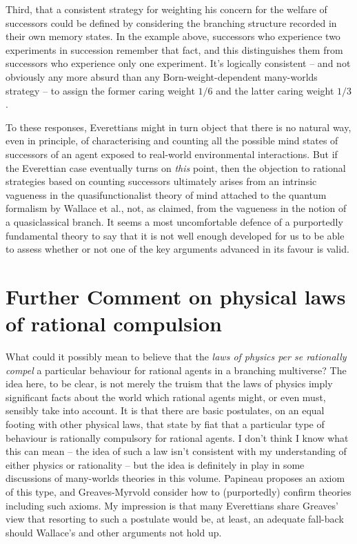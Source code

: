 \documentclass[aps,
pra,epsfig]{revtex4}
\begin{document}
Third, that a consistent strategy for weighting his concern for the 
welfare of successors could be defined by considering the branching 
structure recorded in their own memory states.   In the example
above, successors who
experience two experiments in succession remember that fact, and 
this distinguishes them from successors who experience only one
experiment.  It's logically consistent -- and not obviously any
more absurd than any Born-weight-dependent many-worlds strategy -- to assign
the former caring weight $1/6$ and the latter caring weight $1/3$. 

To these responses, Everettians might in turn object
that there is no natural way,
even in principle, of characterising and counting all the possible
mind states of successors of an agent exposed to real-world
environmental interactions.  But if the Everettian case eventually
turns on {\it this} point, then 
the objection to rational strategies based on counting successors
ultimately arises from an intrinsic vagueness in the quasifunctionalist 
theory of mind attached to the quantum formalism by Wallace et al.,
not, as claimed, from the vagueness in the notion of a quasiclassical
branch.  It seems a most uncomfortable defence of a
purportedly fundamental theory to say that it is not well enough developed
for us to be able to assess whether or not one of the key arguments
advanced in its favour is valid.  

\section{Further Comment on physical laws of rational 
compulsion}\label{rationalconstraint}

What could it possibly mean to 
believe that the {\it laws of physics per se rationally compel} 
a particular behaviour for rational agents in a branching multiverse?   
The idea here, to be clear, is not merely the truism that the laws of physics 
imply significant facts about the world
which rational agents might, or even must, sensibly take into account. 
It is that there are basic postulates, on an equal footing
with other physical laws, that state by fiat that a particular type of
behaviour is rationally compulsory for rational agents.   
I don't think I know what this can mean -- 
the idea of such a law isn't consistent with my understanding of 
either physics or rationality -- but the 
idea is definitely in play in 
some discussions of many-worlds theories in this volume.  
Papineau\cite{papineauvol} 
proposes an axiom of this type, and Greaves-Myrvold\cite{greavesmyrvoldvol}
consider how to (purportedly) confirm theories including such 
axioms.   My impression is that many
Everettians share Greaves' view\cite{greaves} that resorting to such a 
postulate would be, at least, an adequate fall-back 
should Wallace's\cite{wallacevoltwo} and other
arguments not hold up.   
\end{document}
